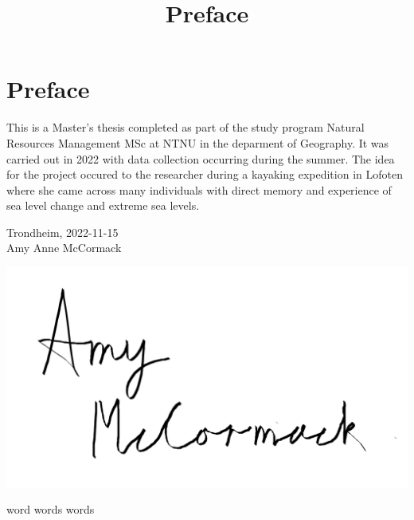 \documentclass{article}
\begin{document}

\section{Preface}


\title{Preface}
This is a Master's thesis completed as part of the study program Natural Resources Management MSc at NTNU in the deparment of Geography. It was carried out in 2022 with data collection occurring during the summer. The idea for the project occured to the researcher during a kayaking expedition in Lofoten where she came across many individuals with direct memory and experience of sea level change and extreme sea levels. \\[2cm]

\begin{center}
Trondheim, 2022-11-15\\[1pc]


Amy Anne McCormack 
\end{center}



\graphicspath{ {./images/} }
\includegraphics[scale=0.5]{fig/to use signature png}
\newpage

\tableofcontents

\renewcommand{\listfigurename}{List of Figures}
\renewcommand{\listtablename}{List of Tables}

\listoffigures
\listoftables
\clearpage
{}



word words words
\end{document}

